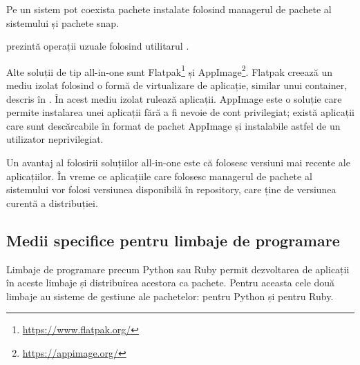 Pe un sistem pot coexista pachete instalate folosind managerul de pachete al sistemului și pachete snap.

 prezintă operații uzuale folosind utilitarul .


Alte soluții de tip all-in-one sunt Flatpak\footnote{\url{https://www.flatpak.org/}} și AppImage\footnote{\url{https://appimage.org/}}. Flatpak creează un mediu izolat folosind o formă de virtualizare de aplicație, similar unui container, descris în . În acest mediu izolat rulează aplicații. AppImage este o soluție care permite instalarea unei aplicații fără a fi nevoie de cont privilegiat; există aplicații care sunt descărcabile în format de pachet AppImage și instalabile astfel de un utilizator neprivilegiat.

Un avantaj al folosirii soluțiilor all-in-one este că folosesc versiuni mai recente ale aplicațiilor. În vreme ce aplicațiile care folosesc managerul de pachete al sistemului vor folosi versiunea disponibilă în repository, care ține de versiunea curentă a distribuției.

\subsection{Medii specifice pentru limbaje de programare}
\label{sec:package:specific}

Limbaje de programare precum Python sau Ruby permit dezvoltarea de aplicații în aceste limbaje și distribuirea acestora ca pachete. Pentru aceasta cele două limbaje au sisteme de gestiune ale pachetelor:  pentru Python și  pentru Ruby.

